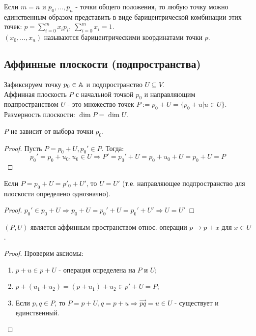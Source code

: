\begin{consequense}
    Если $m = n$ и $p_0,...,p_n$ - точки общего положения, то любую точку можно единственным образом представить в виде барицентрической комбинации этих точек: $p = \sum \limits_{i=0}^m x_ip_i, \ \sum \limits_{i=0}^m x_i = 1$.\\
    $(x_0,...,x_n)$ называются барицентрическими координатами точки $p$.
\end{consequense}
\subsection{Аффинные плоскости (подпространства)}
\begin{definition}
    Зафиксируем точку $p_0 \in \mathbb{A}$ и подпространство $U \subseteq V$.\\
    Аффинная плоскость $P$ с начальной точкой $p_0$ и направляющим подпространством $U$ - это множество точек $P := p_0 + U = \{p_0 + u | u \in U\}$.\\
    Размерность плоскости: $\dim P = \dim U$.
\end{definition}
\begin{subtheorem}
    $P$ не зависит от выбора точки $p_0$.
\end{subtheorem}
\begin{proof}
    Пусть $P = p_0 + U, p_0' \in P$. Тогда:
    $$p_0' = p_0 + u_0, u_0 \in U \Longrightarrow P' = p_0' + U = p_0 + u_0 + U = p_0 + U = P$$
\end{proof}
\begin{subtheorem}
    Если $P = p_0 + U = p'_0 + U'$, то $U = U'$ (т.е. направляющее подпространство для плоскости определено однозначно).
\end{subtheorem}
\begin{proof}
    $p_0' \in p_0 + U \Longrightarrow p_0 + U = p_0' + U = p_0' + U' \Longrightarrow U = U'$
\end{proof}
\begin{subtheorem}
    $(P, U)$ является аффинным пространством относ. операции $p \rightarrow p + x$ для $x \in U$.
\end{subtheorem}
\begin{proof}
    Проверим аксиомы:
    \begin{enumerate}
        \item $p + u \in p + U$ - операция определена на $P$ и $U$;
        \item $p + (u_1 + u_2) = (p + u_1) + u_2 \in p' + U = P$;
        \item Если $p, q \in P$, то $P = p + U, q = p + u \Longrightarrow \overrightarrow{pq} = u \in U$ - существует и единственный.
    \end{enumerate}
\end{proof}

